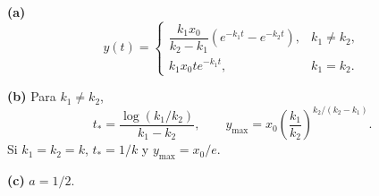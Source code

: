 \noindent\textbf{(a)} \[y(t)=\begin{cases}\dfrac{k_1x_0}{k_2-k_1}(e^{-k_1t}-e^{-k_2t}),&k_1\ne k_2,\\ k_1x_0t e^{-k_1t},&k_1=k_2.\end{cases}\]

\noindent\textbf{(b)} Para $k_1\ne k_2$,\[t_* =\frac{\log(k_1/k_2)}{k_1-k_2},\qquad y_{\max}=x_0\left(\frac{k_1}{k_2}\right)^{k_2/(k_2-k_1)}.\]Si $k_1=k_2=k$, $t_*=1/k$ y $y_{\max}=x_0/e$.

\noindent\textbf{(c)} $a=1/2$.
